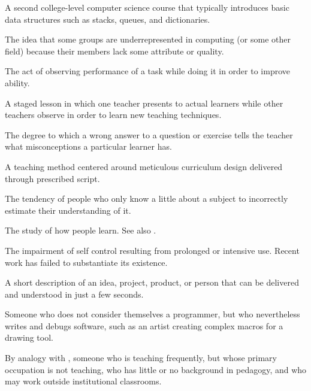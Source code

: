 \begin{description}
 A second college-level computer science course that
typically introduces basic data structures such as stacks, queues, and
dictionaries.

 The idea that some groups are
underrepresented in computing (or some other field) because their members lack
some attribute or quality.

 The act of observing
performance of a task while doing it in order to improve ability.

 A staged lesson in which
one teacher presents to actual learners while other teachers observe in order to
learn new teaching techniques.

 The degree to which a wrong answer
to a question or exercise tells the teacher what misconceptions a particular
learner has.

 A teaching method centered
around meticulous curriculum design delivered through prescribed script.

 The tendency of people
who only know a little about a subject to incorrectly estimate their
understanding of it.

 The study of how
people learn. See also .

 The impairment of self control resulting
from prolonged or intensive use.  Recent work has failed to substantiate its
existence.

 A short description of an idea,
project, product, or person that can be delivered and understood in just a few
seconds.

 Someone who does not
consider themselves a programmer, but who nevertheless writes and debugs
software, such as an artist creating complex macros for a drawing tool.

 By analogy with
,
someone who is teaching frequently, but whose primary occupation is not
teaching, who has little or no background in pedagogy, and who may work outside
institutional classrooms.


\end{description}
